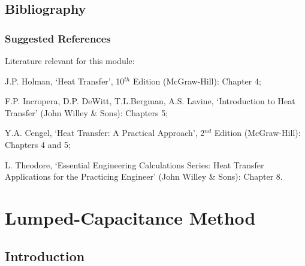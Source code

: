 \documentclass[10pt,compress,unknownkeysallowed]{beamer}
\begin{document}
\subsection{Bibliography} 

\begin{frame}
 \frametitle{Suggested References}
  Literature relevant for this module:
  \begin{enumerate}[{[}1{]}]
    \item J.P. Holman, `Heat Transfer', 10$^{th}$ Edition (McGraw-Hill): Chapter 4;
    \item F.P. Incropera, D.P. DeWitt, T.L.Bergman, A.S. Lavine, `Introduction to Heat Transfer' (John Willey $\&$ Sons): Chapters 5;
    \item Y.A. Cengel, `Heat Transfer: A Practical Approach', 2$^{nd}$ Edition (McGraw-Hill): Chapters 4 and 5;
    \item L. Theodore, `Essential Engineering Calculations Series: Heat Transfer Applications for the Practicing Engineer' (John Willey $\&$ Sons): Chapter 8.
  \end{enumerate}
\end{frame}

\section{Lumped-Capacitance Method}

\subsection{Introduction}
\end{document}
